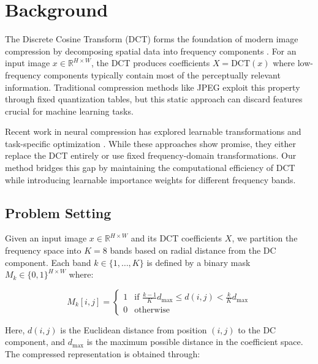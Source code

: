 \documentclass{article} %
\begin{document}

\section{Background}
\label{sec:background}

The Discrete Cosine Transform (DCT) forms the foundation of modern image compression by decomposing spatial data into frequency components \citep{Pennebaker1992JPEGSI}. For an input image $x \in \mathbb{R}^{H \times W}$, the DCT produces coefficients $X = \text{DCT}(x)$ where low-frequency components typically contain most of the perceptually relevant information. Traditional compression methods like JPEG exploit this property through fixed quantization tables, but this static approach can discard features crucial for machine learning tasks.

Recent work in neural compression has explored learnable transformations \citep{Ballé2016EndtoendOI} and task-specific optimization \citep{wang2022learning}. While these approaches show promise, they either replace the DCT entirely or use fixed frequency-domain transformations. Our method bridges this gap by maintaining the computational efficiency of DCT while introducing learnable importance weights for different frequency bands.

\subsection{Problem Setting}
\label{subsec:problem}

Given an input image $x \in \mathbb{R}^{H \times W}$ and its DCT coefficients $X$, we partition the frequency space into $K=8$ bands based on radial distance from the DC component. Each band $k \in \{1,\ldots,K\}$ is defined by a binary mask $M_k \in \{0,1\}^{H \times W}$ where:

\begin{equation}
\label{eq:mask}
M_k[i,j] = \begin{cases}
1 & \text{if } \frac{k-1}{K}d_{\text{max}} \leq d(i,j) < \frac{k}{K}d_{\text{max}} \\
0 & \text{otherwise}
\end{cases}
\end{equation}

Here, $d(i,j)$ is the Euclidean distance from position $(i,j)$ to the DC component, and $d_{\text{max}}$ is the maximum possible distance in the coefficient space. The compressed representation is obtained through:
\end{document}
